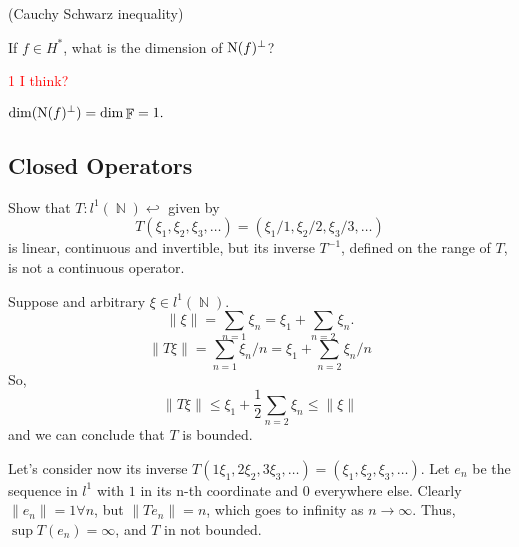 \documentclass{article}
\theoremstyle{exercisestyle}
\newenvironment{exercise}[1]
  {\renewcommand\theinnerex{#1}\innerex}
  {\endinnerex}
\newcommand{\norm}[1]{\lVert #1 \rVert}
\DeclareMathOperator{\Natural}{\mathbb{N}}
\DeclareMathOperator{\field}{\mathbb{F}}
\begin{document}
\begin{exercise}{1.1.39} (Cauchy Schwarz inequality)

\end{exercise}

\begin{exercise}{1.1.42}
    If $f \in H^*$, what is the dimension of $\operatorname{N}(f)^\perp$?

    \textcolor{red}{1 I think?}

    $\dim (\kernel(f)^\perp )= \dim \field = 1.$

\end{exercise}

\subsection{Closed Operators}


\begin{exercise}{1.2.3}
    Show that $T : l^1 (\Natural) \hookleftarrow$ given by $$T (\xi_1, \xi_2, \xi_3, \dots ) = (\xi_1 /1, \xi_2 /2,\xi_3 /3, \dots )$$
    is linear, continuous and invertible, but its inverse $T^{-1}$, defined on the
    range of $T$, is not a continuous operator.


    Suppose and arbitrary $\xi \in l^1(\Natural)$.
    $$\norm{\xi} = \sum_{n=1} \xi_n = \xi_1 + \sum_{n=2} \xi_n.$$
    $$ \norm{T\xi} = \sum_{n=1} \xi_n/n = \xi_1 + \sum_{n=2} \xi_n/n $$
    So,
    $$ \norm{T\xi} \leq \xi_1 + \frac{1}{2} \sum_{n=2} \xi_n \leq \norm{\xi}$$
    and we can conclude that $T$ is bounded.

    Let's consider now its inverse $ T(1\xi_1, 2\xi_2, 3\xi_3, \dots) = (\xi_1, \xi_2,\xi_3, \dots)$. Let $e_n$ be the sequence in $l^1$ with $1$ in its n-th coordinate and
    $0$ everywhere else. Clearly $\norm{e_n} = 1 \forall n$, but $\norm{Te_n} = n$, which goes to infinity as $n\to\infty$. Thus, $\sup T(e_n) = \infty$, and $T$ in not bounded.

\end{exercise}
\end{document}
